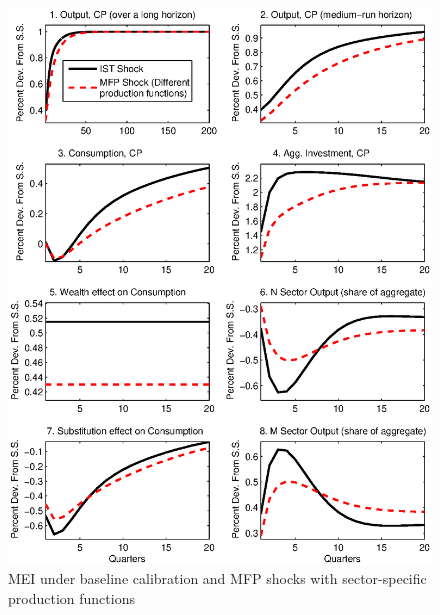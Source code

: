 \documentclass[12pt,fleqn]{article}
\begin{document}
\begin{figure}[tbp] \center
\caption{MEI under baseline calibration and MFP shocks with
sector-specific production functions} \label{figure_c1}
 \includegraphics[scale=0.8]{figure_c1.ps}

\footnotesize \flushleft
{}
\end{figure}
\end{document}

